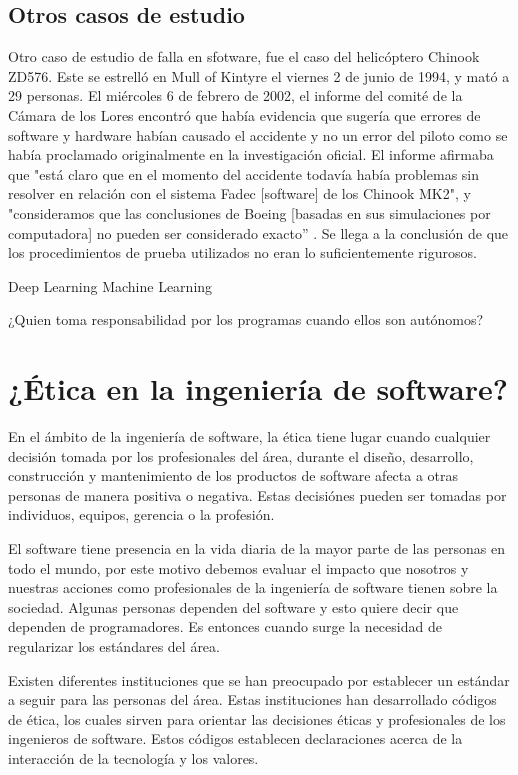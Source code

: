 \documentclass[twoside]{article}
\begin{document}
\begin{multicols}{2}
\subsection{Otros casos de estudio}

Otro caso de estudio de falla en sfotware, fue el caso del helicóptero Chinook
ZD576. Este se estrelló en Mull of Kintyre el viernes 2 de junio de 1994,  y
mató a 29 personas. El miércoles 6 de febrero de 2002, el informe del comité de
la Cámara de los Lores encontró que había evidencia que sugería que errores de
software y hardware habían causado el accidente y no un error del piloto como se
había proclamado originalmente en la investigación oficial. El informe afirmaba
que "está claro que en el momento del accidente todavía había problemas sin
resolver en relación con el sistema Fadec [software] de los Chinook MK2", y
"consideramos que las conclusiones de Boeing [basadas en sus simulaciones por
computadora] no pueden ser considerado exacto” \cite{collins2002software}. Se
llega a la conclusión de que los procedimientos de prueba utilizados no eran lo
suficientemente rigurosos.




Deep Learning
Machine Learning

¿Quien toma responsabilidad por los programas cuando ellos son autónomos?


\section{¿Ética en la ingeniería de software?}

En el ámbito de la ingeniería de software, la ética tiene lugar cuando cualquier
decisión tomada por los profesionales del área, durante el diseño, desarrollo,
construcción y mantenimiento de los productos de software afecta a otras
personas de manera positiva o negativa. Estas decisiónes pueden ser tomadas por
individuos, equipos, gerencia o la profesión.

El software tiene presencia en la vida diaria de la mayor parte de las personas
en todo el mundo, por este motivo debemos evaluar el impacto que nosotros y
nuestras acciones como profesionales de la ingeniería de software tienen sobre
la sociedad. Algunas personas dependen del software y esto quiere decir que
dependen de programadores. Es entonces cuando surge la necesidad de regularizar
los estándares del área.

Existen diferentes instituciones que se han preocupado por establecer un
estándar a seguir para las personas del área. Estas instituciones han
desarrollado códigos de ética, los cuales sirven para orientar las decisiones
éticas y profesionales de los ingenieros de software. Estos códigos establecen
declaraciones acerca de la interacción de la tecnología y los valores.


\end{multicols}
\end{document}
